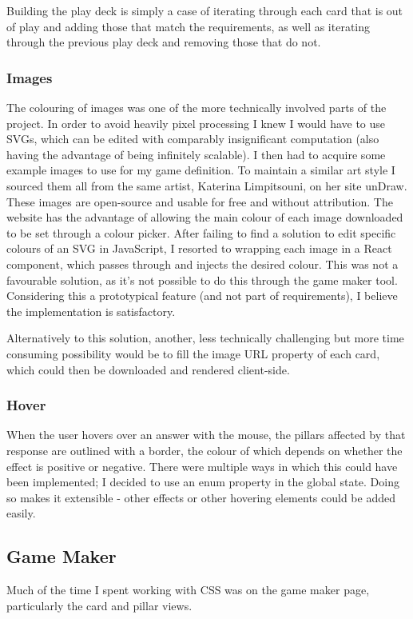 Building the play deck is simply a case of iterating through each card that is out of play and adding those that match the requirements, as well as iterating through the previous play deck and removing those that do not.

\subsubsection{Images}
The colouring of images was one of the more technically involved parts of the project. 
In order to avoid heavily pixel processing I knew I would have to use SVGs, which can be edited with comparably insignificant computation (also having the advantage of being infinitely scalable). 
I then had to acquire some example images to use for my game definition. 
To maintain a similar art style I sourced them all from the same artist, Katerina Limpitsouni, on her site unDraw\cite{Undraw}. These images are open-source and usable for free and without attribution. 
The website has the advantage of allowing the main colour of each image downloaded to be set through a colour picker. 
After failing to find a solution to edit specific colours of an SVG in JavaScript, I resorted to wrapping each image in a React component, which passes through and injects the desired colour. 
This was not a favourable solution, as it's not possible to do this through the game maker tool. 
Considering this a prototypical feature (and not part of requirements), I believe the implementation is satisfactory.

Alternatively to this solution, another, less technically challenging but more time consuming possibility would be to fill the image URL property of each card, which could then be downloaded and rendered client-side.

\subsubsection{Hover}
When the user hovers over an answer with the mouse, the pillars affected by that response are outlined with a border, the colour of which depends on whether the effect is positive or negative. 
There were multiple ways in which this could have been implemented; I decided to use an enum property in the global state. 
Doing so makes it extensible - other effects or other hovering elements could be added easily.

\subsection{Game Maker}
Much of the time I spent working with CSS was on the game maker page, particularly the card and pillar views. 

